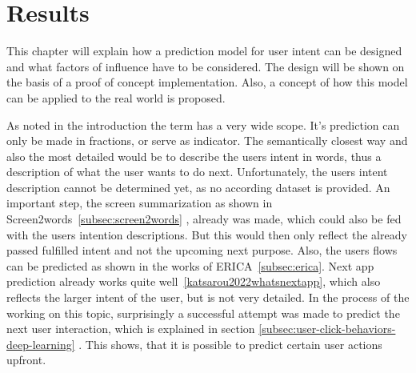 \chapter{Results}
\label{ch:results}

%

This chapter will explain how a prediction model for user intent can be designed and what factors of influence have to be considered.
The design will be shown on the basis of a proof of concept implementation.
Also, a concept of how this model can be applied to the real world is proposed. 

As noted in the introduction the term  has a very wide scope.
It's prediction can only be made in fractions, or serve as indicator.
The semantically closest way and also the most detailed would be to describe the users intent in words, thus a description of what the user wants to do next.
Unfortunately, the users intent description cannot be determined yet, as no according dataset is provided.
An important step, the screen summarization as shown in Screen2words~\ref{subsec:screen2words} \cite{wang2021screen2words}, already was made, which could also be fed with the users intention descriptions.
But this would then only reflect the already passed fulfilled intent and not the upcoming next purpose.
Also, the users flows can be predicted as shown in the works of ERICA~\ref{subsec:erica}.
Next app prediction already works quite well~\ref{katsarou2022whatsnextapp}, which also reflects the larger intent of the user, but is not very detailed.
In the process of the working on this topic, surprisingly a successful attempt was made to predict the next user interaction, which is explained in section \ref{subsec:user-click-behaviors-deep-learning} \cite{zhou2021large}.
This shows, that it is possible to predict certain user actions upfront.

